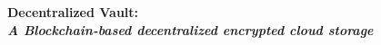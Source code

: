 {
  \huge
  \bfseries
  Decentralized Vault: \\
  \mdseries
  \itshape
  \Large
  A Blockchain-based decentralized encrypted cloud storage
  \par
}